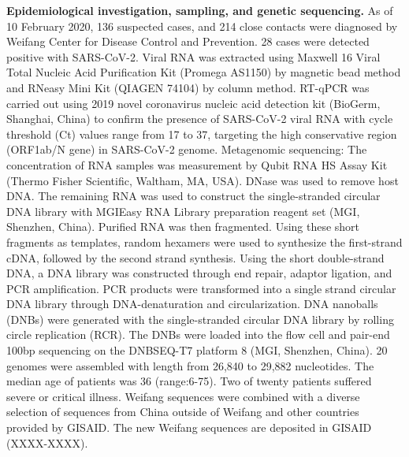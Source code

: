 \documentclass[9pt,lineno,onehalfspacing]{elife}
\begin{document}
{\flushleft\bf Epidemiological investigation, sampling, and genetic sequencing.}
As of 10 February 2020, 136 suspected cases, and 214 close contacts were diagnosed by
Weifang Center for Disease Control and Prevention. 28 cases were detected positive with
SARS-CoV-2. Viral RNA was extracted using Maxwell 16 Viral Total Nucleic Acid
Purification Kit (Promega AS1150) by magnetic bead method and RNeasy Mini Kit
(QIAGEN 74104) by column method. RT-qPCR was carried out using 2019 novel
coronavirus nucleic acid detection kit (BioGerm, Shanghai, China) to confirm the presence of
SARS-CoV-2 viral RNA with cycle threshold (Ct) values range from 17 to 37, targeting the
high conservative region (ORF1ab/N gene) in SARS-CoV-2 genome.
Metagenomic sequencing:
The concentration of RNA samples was measurement by Qubit RNA HS Assay Kit (Thermo
Fisher Scientific, Waltham, MA, USA). DNase was used to remove host DNA. The
remaining RNA was used to construct the single-stranded circular DNA library with
MGIEasy RNA Library preparation reagent set (MGI, Shenzhen, China). Purified RNA was
then fragmented. Using these short fragments as templates, random hexamers were used to
synthesize the first-strand cDNA, followed by the second strand synthesis. Using the short
double-strand DNA, a DNA library was constructed through end repair, adaptor ligation, and
PCR amplification. PCR products were transformed into a single strand circular DNA library
through DNA-denaturation and circularization. DNA nanoballs (DNBs) were generated with
the single-stranded circular DNA library by rolling circle replication (RCR). The DNBs were
loaded into the flow cell and pair-end 100bp sequencing on the DNBSEQ-T7 platform 8
(MGI, Shenzhen, China).
20 genomes were assembled with length from 26,840 to 29,882 nucleotides.
The median age of patients was 36 (range:6-75). Two of twenty patients suffered severe or critical illness. 
Weifang sequences were combined with a diverse selection of sequences from China outside of Weifang and other countries provided by GISAID\cite{elbe2017data}. 
The new Weifang sequences are deposited in GISAID (XXXX-XXXX). 
\end{document}
